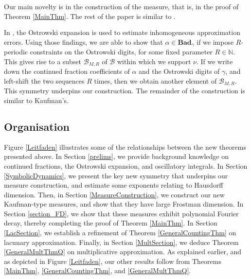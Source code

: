 \documentclass[12pt, reqno]{amsart}
\theoremstyle{definition}
\theoremstyle{remark}
\numberwithin{equation}{section}
\def\alp{{\alpha}} \def\bfalp{{\boldsymbol \alpha}}
\def\gam{{\gamma}} \def\Gam{{\Gamma}}
\def \bN {\mathbb N}
\def \cB {\mathcal B}
\def \Bad {{\mathrm{\mathbf{Bad}}}}
\begin{document}
	Our main novelty is in the construction of the measure, that is, in the proof of Theorem \ref{MainThm}. The rest of the paper is similar to \cite{PVZZ2022}. 
	
	In \cite[\S 4]{BHV}, the Ostrowski expansion is used to estimate inhomogeneous approximation errors. Using those findings, we are able to show that $\alp \in \Bad_\gam$ if we impose $R$-periodic constraints on the Ostrowski digits, for some fixed parameter $R \in \bN$. This gives rise to a subset $\cB_{M,R}$ of $\cB$ within which we support $\nu$. If we write down the continued fraction coefficients of $\alp$ and the Ostrowski digits of $\gam$, and left-shift the two sequences $R$ times, then we obtain another element of $\cB_{M,R}$. This symmetry underpins our construction. The remainder of the construction is similar to Kaufman's.
	
	\subsection*{Organisation}
	
	Figure \ref{Leitfaden} illustrates some of the relationships between the new theorems presented above. In Section \ref{prelims}, we provide background knowledge on continued fractions, the Ostrowski expansion, and oscillatory integrals. In Section \ref{SymbolicDynamics}, we present the key new symmetry that underpins our measure construction, and estimate some exponents relating to Hausdorff dimension. Then, in Section \ref{MeasureConstruction}, we construct our new Kaufman-type measures, and show that they have large Frostman dimension. In Section \ref{section_FD}, we show that these measures exhibit polynomial Fourier decay, thereby completing the proof of Theorem \ref{MainThm}. In Section \ref{LacSection}, we establish a refinement of Theorem \ref{GeneralCountingThm} on lacunary approximation. Finally, in Section \ref{MultSection}, we deduce Theorem \ref{GeneralMultThmQ} on multiplicative approximation. As explained earlier, and as depicted in Figure \ref{Leitfaden}, our other results follow from Theorems \ref{MainThm}, \ref{GeneralCountingThm}, and \ref{GeneralMultThmQ}.
	
\end{document}
